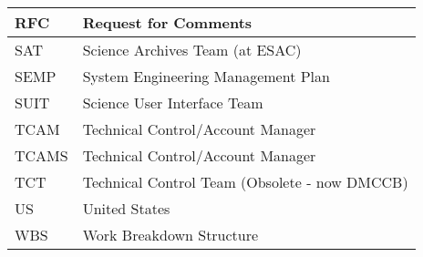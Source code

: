 \begin{longtable}{|l|p{}|}
RFC&Request for Comments \\\hline
SAT&Science Archives Team (at ESAC) \\\hline
SEMP&System Engineering Management Plan \\\hline
SUIT&Science User Interface Team \\\hline
TCAM&Technical Control/Account Manager \\\hline
TCAMS&Technical Control/Account Manager \\\hline
TCT&Technical Control Team (Obsolete - now DMCCB) \\\hline
US&United States \\\hline
WBS&Work Breakdown Structure \\\hline
\end{longtable} 
